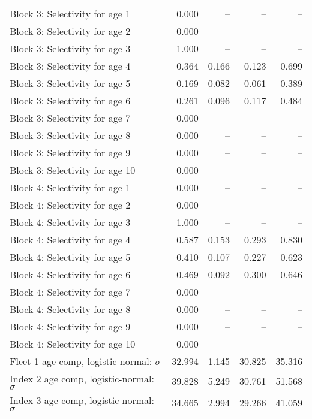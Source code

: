 \documentclass[
]{article}
\begin{document}
\begin{landscape}
\begin{longtable}[t]{lrrrr}
Block 3: Selectivity for age 1 & 0.000 & -- & -- & --\\
Block 3: Selectivity for age 2 & 0.000 & -- & -- & --\\
Block 3: Selectivity for age 3 & 1.000 & -- & -- & --\\
Block 3: Selectivity for age 4 & 0.364 & 0.166 & 0.123 & 0.699\\
\addlinespace
Block 3: Selectivity for age 5 & 0.169 & 0.082 & 0.061 & 0.389\\
Block 3: Selectivity for age 6 & 0.261 & 0.096 & 0.117 & 0.484\\
Block 3: Selectivity for age 7 & 0.000 & -- & -- & --\\
Block 3: Selectivity for age 8 & 0.000 & -- & -- & --\\
Block 3: Selectivity for age 9 & 0.000 & -- & -- & --\\
\addlinespace
Block 3: Selectivity for age 10+ & 0.000 & -- & -- & --\\
Block 4: Selectivity for age 1 & 0.000 & -- & -- & --\\
Block 4: Selectivity for age 2 & 0.000 & -- & -- & --\\
Block 4: Selectivity for age 3 & 1.000 & -- & -- & --\\
Block 4: Selectivity for age 4 & 0.587 & 0.153 & 0.293 & 0.830\\
\addlinespace
Block 4: Selectivity for age 5 & 0.410 & 0.107 & 0.227 & 0.623\\
Block 4: Selectivity for age 6 & 0.469 & 0.092 & 0.300 & 0.646\\
Block 4: Selectivity for age 7 & 0.000 & -- & -- & --\\
Block 4: Selectivity for age 8 & 0.000 & -- & -- & --\\
Block 4: Selectivity for age 9 & 0.000 & -- & -- & --\\
\addlinespace
Block 4: Selectivity for age 10+ & 0.000 & -- & -- & --\\
Fleet 1 age comp, logistic-normal: $\sigma$ & 32.994 & 1.145 & 30.825 & 35.316\\
Index 2 age comp, logistic-normal: $\sigma$ & 39.828 & 5.249 & 30.761 & 51.568\\
Index 3 age comp, logistic-normal: $\sigma$ & 34.665 & 2.994 & 29.266 & 41.059\\*
\end{longtable}
\end{landscape}
\end{document}
